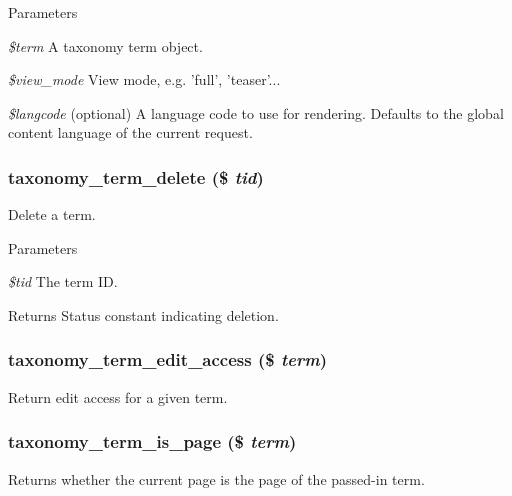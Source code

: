 \begin{DoxyParams}{Parameters}
\item[{\em \$term}]A taxonomy term object. \item[{\em \$view\_\-mode}]View mode, e.g. 'full', 'teaser'... \item[{\em \$langcode}](optional) A language code to use for rendering. Defaults to the global content language of the current request. \end{DoxyParams}
\hypertarget{taxonomy_8module_a4439428fa6a739b263aeef517a9f8876}{
\subsubsection[{taxonomy\_\-term\_\-delete}]{\setlength{\rightskip}{0pt plus 5cm}taxonomy\_\-term\_\-delete (\$ {\em tid})}}
\label{taxonomy_8module_a4439428fa6a739b263aeef517a9f8876}
Delete a term.


\begin{DoxyParams}{Parameters}
\item[{\em \$tid}]The term ID. \end{DoxyParams}
\begin{DoxyReturn}{Returns}
Status constant indicating deletion. 
\end{DoxyReturn}
\hypertarget{taxonomy_8module_a6fdc3ccdb297a344ec6013b4378420da}{
\subsubsection[{taxonomy\_\-term\_\-edit\_\-access}]{\setlength{\rightskip}{0pt plus 5cm}taxonomy\_\-term\_\-edit\_\-access (\$ {\em term})}}
\label{taxonomy_8module_a6fdc3ccdb297a344ec6013b4378420da}
Return edit access for a given term. \hypertarget{taxonomy_8module_a7a756c8de0de6b5cdc5c58cd89cda853}{
\subsubsection[{taxonomy\_\-term\_\-is\_\-page}]{\setlength{\rightskip}{0pt plus 5cm}taxonomy\_\-term\_\-is\_\-page (\$ {\em term})}}
\label{taxonomy_8module_a7a756c8de0de6b5cdc5c58cd89cda853}
Returns whether the current page is the page of the passed-\/in term.


